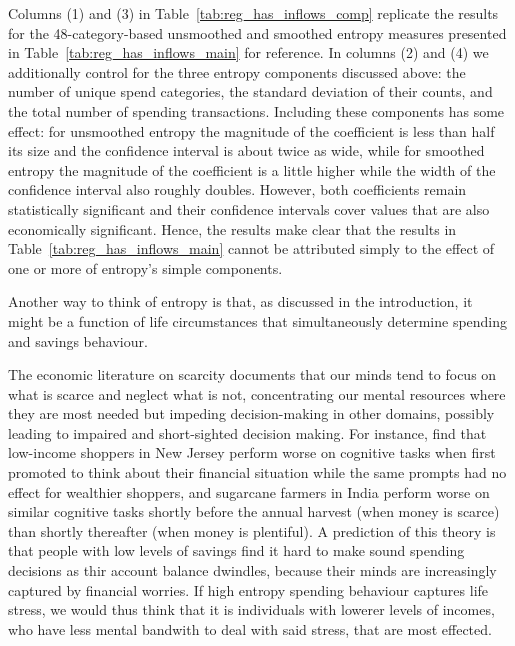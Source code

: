 

Columns (1) and (3) in Table~\ref{tab:reg_has_inflows_comp} replicate the
results for the 48-category-based unsmoothed and smoothed entropy measures
presented in Table~\ref{tab:reg_has_inflows_main} for reference. In columns (2)
and (4) we additionally control for the three entropy components discussed
above: the number of unique spend categories, the standard deviation of their
counts, and the total number of spending transactions. Including these
components has some effect: for unsmoothed entropy the magnitude of the
coefficient is less than half its size and the confidence interval is about
twice as wide, while for smoothed entropy the magnitude of the coefficient is a
little higher while the width of the confidence interval also roughly doubles.
However, both coefficients remain statistically significant and their
confidence intervals cover values that are also economically significant.
Hence, the results make clear that the results in
Table~\ref{tab:reg_has_inflows_main} cannot be attributed simply to the effect
of one or more of entropy's simple components.

Another way to think of entropy is that, as discussed in the introduction, it
might be a function of life circumstances that simultaneously determine
spending and savings behaviour.


The economic literature on scarcity documents that our minds tend to focus on
what is scarce and neglect what is not, concentrating our mental resources
where they are most needed but impeding decision-making in other domains,
possibly leading to impaired and short-sighted decision
making\citep{shah2012some, mullainathan2013scarcity, haushofer2014psychology}.
For instance, \citet{mani2013poverty} find that low-income shoppers in New
Jersey perform worse on cognitive tasks when first promoted to think about
their financial situation while the same prompts had no effect for wealthier
shoppers, and sugarcane farmers in India perform worse on similar cognitive
tasks shortly before the annual harvest (when money is scarce) than shortly
thereafter (when money is plentiful). A prediction of this theory is that
people with low levels of savings find it hard to make sound spending decisions
as thir account balance dwindles, because their minds are increasingly captured
by financial worries. If high entropy spending behaviour captures life stress,
we would thus think that it is individuals with lowerer levels of incomes, who
have less mental bandwith to deal with said stress, that are most effected.

